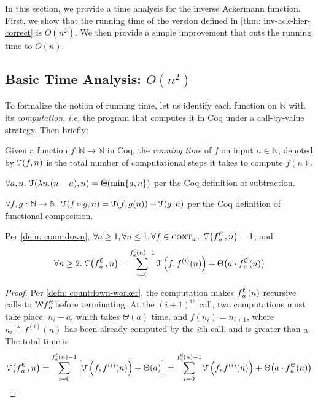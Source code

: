 In this section, we provide a time analysis for the
inverse Ackermann function. First, we show that the
running time of the version defined in \cref{thm: inv-ack-hier-correct}
is $O(n^2)$. We then provide a simple improvement that
cuts the running time to $O(n)$.

\subsection{Basic Time Analysis: $O(n^2)$}
To formalize the notion of running time, let us identify each function on 
$\mathbb{N}$ with its \emph{computation}, \emph{i.e.} the program that computes 
it in Coq under a call-by-value strategy.  Then briefly:
\begin{defn}
 Given a function $f:\mathbb{N}\to\mathbb{N}$ in Coq, the \emph{running time} of $f$ on input $n\in \mathbb{N}$, denoted by $\mathcal{T}(f, n)$ is the total number of computational steps it takes to compute $f(n)$.
\end{defn}
\begin{lem} \label{lem: sub-runtime}
	$\forall a, n.~ \mathcal{T}(\lambda n.(n - a), n) = \Theta(\min\{a, n\})$ per the Coq definition of subtraction.
\end{lem}
\begin{lem} \label{lem: compose-runtime}
	$\forall f, g: \mathbb{N}\to \mathbb{N}.~\mathcal{T}(f\circ g, n) = \mathcal{T}(f, g(n)) + \mathcal{T}(g, n)$ per the Coq definition of functional composition.
\end{lem}
\begin{lem} \label{lem: cdt-runtime}
	Per \cref{defn: countdown}, $\forall a\ge 1, \forall n\le 1, \forall f\in \text{\scshape{cont}}_{a}$.~$\runtime\big(\cdt{f}{a}\ , n\big) = 1$, and
	\begin{equation*}
	\forall n\ge 2.~\runtime\big(\cdt{f}{a}\ , n\big) = \sum_{i=0}^{\cdt{f}{a}(n) - 1} \runtime\left(f, f^{(i)}(n)\right) + \Theta\big(a\cdot \cdt{f}{a}(n)\big)
	\end{equation*}
\end{lem}
\begin{proof}
	Per \cref{defn: countdown-worker}, the computation makes $\cdt{f}{a}(n)$ recursive calls to $\W\cdt{f}{a}$ before terminating. At the $(i+1)^{\text{th}}$ call, two computations must take place: $n_i - a$, which takes $\Theta(a)$ time, and $f(n_i) = n_{i+1}$, where $n_i \triangleq f^{(i)}(n)$ has been already computed by the $i$th call, and is greater than $a$.  The total time is 
	\begin{equation*}
	\runtime\big(\cdt{f}{a}\ , n\big)
	= \sum_{i=0}^{\cdt{f}{a}(n) - 1} \left[\runtime\left(f, f^{(i)}(n)\right) + \Theta(a)\right]
	= \sum_{i=0}^{\cdt{f}{a}(n) - 1} \runtime\left(f, f^{(i)}(n)\right) + \Theta\big(a\cdot \cdt{f}{a}(n)\big)
	\end{equation*}
\end{proof}

